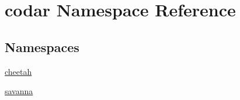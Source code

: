 \hypertarget{namespacecodar}{}\section{codar Namespace Reference}
\label{namespacecodar}
\subsection*{Namespaces}
\begin{DoxyCompactItemize}
\item 
 \hyperlink{namespacecodar_1_1cheetah}{cheetah}
\item 
 \hyperlink{namespacecodar_1_1savanna}{savanna}
\end{DoxyCompactItemize}
